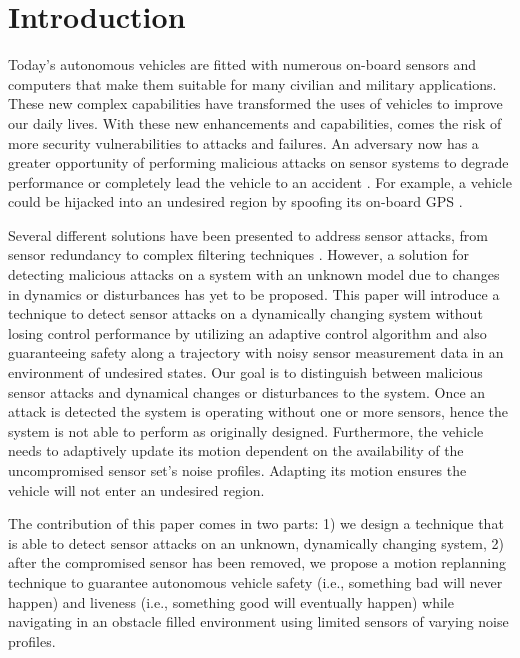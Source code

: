 
\section{Introduction} \label{sec:introduction}

Today's autonomous vehicles are fitted with numerous on-board sensors and computers that make them suitable for many civilian and military applications. These new complex capabilities have transformed the uses of vehicles to improve our daily lives. With these new enhancements and capabilities, comes the risk of more security vulnerabilities to attacks and failures. An adversary now has a greater opportunity of performing malicious attacks on sensor systems to degrade performance or completely lead the vehicle to an accident . For example, a vehicle could be hijacked into an undesired region by spoofing its on-board GPS \cite{lee}.

Several different solutions have been presented to address sensor attacks, from sensor redundancy to complex filtering techniques \cite{fawzi2014secure,pasqualetti2013attack,6120187,6943080,7330811}. However, a solution for detecting malicious attacks on a system with an unknown model due to changes in dynamics or disturbances has yet to be proposed. This paper will introduce a technique to detect sensor attacks on a dynamically changing system without losing control performance by utilizing an adaptive control algorithm and also guaranteeing safety along a trajectory with noisy sensor measurement data in an environment of undesired states. Our goal is to distinguish between malicious sensor attacks and dynamical changes or disturbances to the system. Once an attack is detected the system is operating without one or more sensors, hence the system is not able to perform as originally designed. Furthermore, the vehicle needs to adaptively update its motion dependent on the availability of the uncompromised sensor set's noise profiles. Adapting its motion ensures the vehicle will not enter an undesired region.

The contribution of this paper comes in two parts: 1) we design a technique that is able to detect sensor attacks on an unknown, dynamically changing system, 2) after the compromised sensor has been removed, we propose a motion replanning technique to guarantee autonomous vehicle safety (i.e., something bad will never happen) and liveness (i.e., something good will eventually happen) while navigating in an obstacle filled environment using limited sensors of varying noise profiles. 

